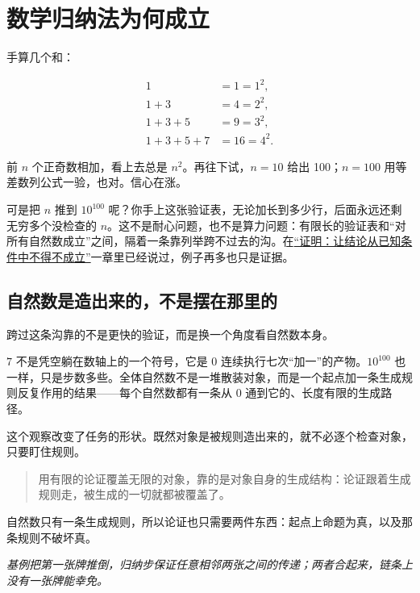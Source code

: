 \section{数学归纳法为何成立}
\label{sec:01-Mathematical-Language/04-Induction-and-Recursion/01}

手算几个和：

\[
\begin{aligned}
1 &= 1 = 1^2,\\
1+3 &= 4 = 2^2,\\
1+3+5 &= 9 = 3^2,\\
1+3+5+7 &= 16 = 4^2.
\end{aligned}
\]

前 \(n\) 个正奇数相加，看上去总是 \(n^2\)。再往下试，\(n=10\) 给出 100；\(n=100\) 用等差数列公式一验，也对。信心在涨。

可是把 \(n\) 推到 \(10^{100}\) 呢？你手上这张验证表，无论加长到多少行，后面永远还剩无穷多个没检查的 \(n\)。这不是耐心问题，也不是算力问题：有限长的验证表和``对所有自然数成立''之间，隔着一条靠列举跨不过去的沟。在\hyperref[ch:006]{``证明：让结论从已知条件中不得不成立''}一章里已经说过，例子再多也只是证据。

\subsection{自然数是造出来的，不是摆在那里的}

跨过这条沟靠的不是更快的验证，而是换一个角度看自然数本身。

\(7\) 不是凭空躺在数轴上的一个符号，它是 \(0\) 连续执行七次``加一''的产物。\(10^{100}\) 也一样，只是步数多些。全体自然数不是一堆散装对象，而是一个起点加一条生成规则反复作用的结果——每个自然数都有一条从 \(0\) 通到它的、长度有限的生成路径。

这个观察改变了任务的形状。既然对象是被规则造出来的，就不必逐个检查对象，只要盯住规则。

\begin{quote}
用有限的论证覆盖无限的对象，靠的是对象自身的生成结构：论证跟着生成规则走，被生成的一切就都被覆盖了。
\end{quote}

自然数只有一条生成规则，所以论证也只需要两件东西：起点上命题为真，以及那条规则不破坏真。

\begin{center}

\emph{基例把第一张牌推倒，归纳步保证任意相邻两张之间的传递；两者合起来，链条上没有一张牌能幸免。}
\end{center}

